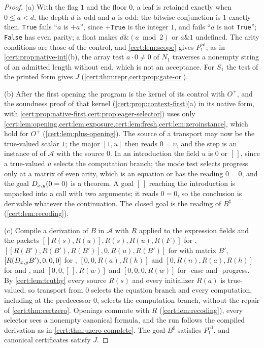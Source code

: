 \begin{proof}
(a) With the flag $1$ and the floor $0$, a leaf is retained exactly when
$0\le a<d$, the depth $d$ is odd and $a$ is odd: the bitwise conjunction is $1$
exactly then. \texttt{True} fails ``$a$ is $+a$'', since $+\texttt{True}$ is the
integer $1$, and fails ``$a$ is not \texttt{True}''; \texttt{False} has even
parity; a float makes $d\mathbin{\&}(a\bmod 2)$ or $a\mathbin{\&}1$ undefined.
The arity conditions are those of the control, and \cref{cert:lem:scope} gives
$P^{\mathrm{ed}}_{1}$; as in \cref{cert:prop:native-int}(b), the array test
$a\cdot 0\neq 0$ of $N_1$ traverses a nonempty string of an admitted length
without end, which is not an acceptance. For $S_1$ the test of the printed
form gives $J$
(\cref{cert:thm:repr,cert:prop:gate-or}).

(b) After the first opening the program is the kernel of its control with
$O^{+}$, and the soundness proof of that kernel
(\cref{cert:prop:context-first}(a) in its native form, with
\cref{cert:prop:native-first,cert:prop:eager-selector}) uses only
\cref{cert:lem:opening,cert:lem:exposure,cert:lem:fresh,cert:lem:zeroinstance},
which hold for $O^{+}$ (\cref{cert:lem:plus-opening}). The source of a
transport may now be the true-valued scalar $1$; the major $[1,u]$ then reads
$0=\upsilon$, and the step is an instance of  of $\mathcal A$ with
the source $0$. In an introduction the field $u$ is $0$ or $[\,]$, since a
true-valued $u$ selects the computation branch; the mode test selects progress
only at a matrix of even arity, which is an equation or has the reading $0=0$,
and the goal $D_{x,y}(0=0)$ is a theorem. A goal $[\,]$ reaching the
introduction is unpacked into a call with two arguments; it reads $0=0$, so
the conclusion is derivable whatever the continuation. The closed goal is the
reading of $B^{\sharp}$ (\cref{cert:lem:recoding}).

(c) Compile a derivation of $B$ in $\mathcal A$ with $R$ applied to the
expression fields and the packets $[[R(s),R(u)],R(s),R(u),R(F)]$ for
, $[[R(B'),R(B'),R(B')],0,R(u),R(B')]$ for  with
matrix $B'$, $[R(D_{x,y}B'),0,0,0]$ for ,
$[0,0,R(a),R(h)]$ and $[0,R(n),R(a),R(h)]$ for  and ,
and $[0,0,[\,],R(w)]$ and $[0,0,0,R(w)]$ for -case and
-progress. By \cref{cert:lem:truthy} every source $R(s)$ and every
initializer $R(a)$ is true-valued, so transport from $0$ selects the equation
branch and every computation, including  at the predecessor $0$,
selects the computation branch, without the repair of
\cref{cert:thm:certzero}. Openings commute with $R$
(\cref{cert:lem:recoding}), every selector sees a nonempty canonical formula,
and the run follows the compiled derivation as in
\cref{cert:thm:uzero-complete}. The goal $B^{\sharp}$ satisfies
$P^{\mathrm{ed}}_{1}$, and canonical certificates satisfy $J$.
\end{proof}

